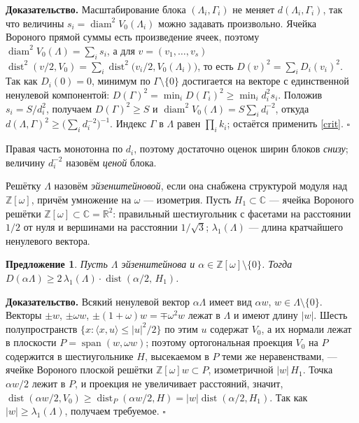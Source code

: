\documentclass{article}
\newcommand{\R}{\mathbb{R}}
\newcommand{\Z}{\mathbb{Z}}
\newcommand{\CC}{\mathbb{C}}
\newcommand{\diam}{\operatorname{diam}}
\newcommand{\dist}{\operatorname{dist}}
\newtheorem{proposition}{Предложение}
\begin{document}
\textbf{Доказательство.}
Масштабирование блока $(\Lambda_i,\Gamma_i)$ не меняет $d(\Lambda_i,\Gamma_i)$, так что
величины $s_i=\diam^2V_0(\Lambda_i)$ можно задавать произвольно. Ячейка
Вороного прямой суммы есть произведение ячеек, поэтому
$\diam^2V_0(\Lambda)=\sum_i s_i$, а для $v=(v_1,\dots,v_s)$
$\dist^2(v/2,V_0)=\sum_i\dist^2\bigl(v_i/2,V_0(\Lambda_i)\bigr)$, то есть
$D(v)^2=\sum_iD_i(v_i)^2$. Так как $D_i(0)=0$, минимум по
$\Gamma\setminus\{0\}$ достигается на векторе с единственной ненулевой
компонентой: $D(\Gamma)^2=\min_iD(\Gamma_i)^2\ge\min_i d_i^2s_i$. Положив
$s_i=S/d_i^2$, получаем $D(\Gamma)^2\ge S$ и
$\diam^2V_0(\Lambda)=S\sum_id_i^{-2}$, откуда
$d(\Lambda,\Gamma)^2\ge\bigl(\sum_id_i^{-2}\bigr)^{-1}$. Индекс $\Gamma$ в
$\Lambda$ равен $\prod_ik_i$; остаётся применить \eqref{crit}. $\square$

Правая часть монотонна по $d_i$, поэтому достаточно оценок ширин блоков
\emph{снизу}; величину $d_i^{-2}$ назовём \emph{ценой} блока.

Решётку $\Lambda$ назовём \emph{эйзенштейновой}, если она снабжена
структурой модуля над $\Z[\omega]$, причём умножение на $\omega$ ---
изометрия. Пусть $H_1\subset\CC$ --- ячейка Вороного решётки
$\Z[\omega]\subset\CC=\R^2$: правильный шестиугольник с фасетами на расстоянии
$1/2$ от нуля и вершинами на расстоянии $1/\sqrt3$; $\lambda_1(\Lambda)$ ---
длина кратчайшего ненулевого вектора.

\begin{proposition}
Пусть $\Lambda$ эйзенштейнова и $\alpha\in\Z[\omega]\setminus\{0\}$. Тогда
$D(\alpha\Lambda)\ge2\,\lambda_1(\Lambda)\cdot\dist(\alpha/2,\,H_1)$.
\end{proposition}

\textbf{Доказательство.}
Всякий ненулевой вектор $\alpha\Lambda$ имеет вид $\alpha w$, $w\in\Lambda
\setminus\{0\}$. Векторы $\pm w$, $\pm\omega w$, $\pm(1+\omega)w=\mp\omega^2w$
лежат в $\Lambda$ и имеют длину $|w|$. Шесть полупространств
$\{x:\langle x,u\rangle\le|u|^2/2\}$ по этим $u$ содержат $V_0$, а их нормали
лежат в плоскости $P=\operatorname{span}(w,\omega w)$; поэтому ортогональная
проекция $V_0$ на $P$ содержится в шестиугольнике $H$, высекаемом в $P$ теми
же неравенствами, --- ячейке Вороного плоской решётки $\Z[\omega]w\subset P$,
изометричной $|w|\,H_1$. Точка $\alpha w/2$ лежит в $P$, и проекция не
увеличивает расстояний, значит,
$\dist(\alpha w/2,V_0)\ge\dist_P(\alpha w/2,H)=|w|\dist(\alpha/2,H_1)$. Так как
$|w|\ge\lambda_1(\Lambda)$, получаем требуемое. $\square$
\end{document}
